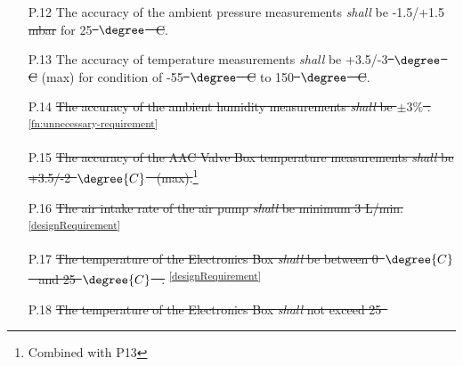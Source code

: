 \documentclass[a4paper,12pt,oneside]{article} %
\providecommand{\DIFaddtex}[1]{{\protect\color{blue}\uwave{#1}}} %
\providecommand{\DIFdeltex}[1]{{\protect\color{red}\sout{#1}}}                      %
\providecommand{\DIFaddbegin}{} %
\providecommand{\DIFaddend}{} %
\providecommand{\DIFdelbegin}{} %
\providecommand{\DIFdelend}{} %
\providecommand{\DIFadd}[1]{\texorpdfstring{\DIFaddtex{#1}}{#1}} %
\providecommand{\DIFdel}[1]{\texorpdfstring{\DIFdeltex{#1}}{}} %
\newcommand{\DIFscaledelfig}{0.5}
\newlength{\DIFdelgraphicswidth} %
\newlength{\DIFdelgraphicsheight} %
\newcommand{\DIFaddincludegraphics}[2][]{{\color{blue}\fbox{\DIFOincludegraphics[#1]{#2}}}} %
\newcommand{\DIFdelincludegraphics}[2][]{%
\sbox{\DIFdelgraphicsbox}{\DIFOincludegraphics[#1]{#2}}%
\settoboxwidth{\DIFdelgraphicswidth}{\DIFdelgraphicsbox} %
\settoboxtotalheight{\DIFdelgraphicsheight}{\DIFdelgraphicsbox} %
\scalebox{\DIFscaledelfig}{%
\parbox[b]{\DIFdelgraphicswidth}{\usebox{\DIFdelgraphicsbox}\\[-\baselineskip] \rule{\DIFdelgraphicswidth}{0em}}\llap{\resizebox{\DIFdelgraphicswidth}{\DIFdelgraphicsheight}{%
\setlength{\unitlength}{\DIFdelgraphicswidth}%
\begin{picture}(1,1)%
\thicklines\linethickness{2pt} %
{\color[rgb]{1,0,0}\put(0,0){\framebox(1,1){}}}%
{\color[rgb]{1,0,0}\put(0,0){\line( 1,1){1}}}%
{\color[rgb]{1,0,0}\put(0,1){\line(1,-1){1}}}%
\end{picture}%
}\hspace*{3pt}}} %
} %
\DeclareRobustCommand{\DIFaddbegin}{\DIFOaddbegin \let\includegraphics\DIFaddincludegraphics} %
\DeclareRobustCommand{\DIFaddend}{\DIFOaddend \let\includegraphics\DIFOincludegraphics} %
\DeclareRobustCommand{\DIFdelbegin}{\DIFOdelbegin \let\includegraphics\DIFdelincludegraphics} %
\DeclareRobustCommand{\DIFdelend}{\DIFOaddend \let\includegraphics\DIFOincludegraphics} %
\begin{document}
\begin{appendices}
\begin{enumerate}
    \item[P.12] The accuracy of the ambient pressure measurements \textit{shall} be -1.5/+1.5 \DIFdelbegin \DIFdel{mbar }\DIFdelend \DIFaddbegin \DIFadd{hPa }\DIFaddend for 25\DIFdelbegin \DIFdel{\mbox{%
$\degree$
}%
C}\DIFdelend \DIFaddbegin \DIFadd{\mbox{%
$\degree{C}$
}%
}\DIFaddend .
    \item[P.13] The accuracy of temperature measurements \textit{shall} be +3.5/-3\DIFdelbegin \DIFdel{\mbox{%
$\degree$
}%
C }\DIFdelend \DIFaddbegin \DIFadd{\mbox{%
$\degree{C}$
}%
}\DIFaddend (max) for condition of -55\DIFdelbegin \DIFdel{\mbox{%
$\degree$
}%
C }\DIFdelend \DIFaddbegin \DIFadd{\mbox{%
$\degree{C}$
}%
}\DIFaddend to 150\DIFdelbegin \DIFdel{\mbox{%
$\degree$
}%
C}\DIFdelend \DIFaddbegin \DIFadd{\mbox{%
$\degree{C}$
}%
}\DIFaddend .
    \item[P.14] \st{The accuracy of the ambient humidity measurements \textit{shall} be $\pm 3\%$ .} \cite{Humiditysensor}\textsuperscript{\ref{fn:unnecessary-requirement}}
    \item[P.15] \DIFdelbegin %
\DIFdelend \DIFaddbegin \st{The accuracy of the AAC Valve Box temperature measurements \textit{shall} be +3.5/-2\mbox{%
$\degree{C}$
}%
(max).}\DIFaddend \footnote{Combined with P13\label{fn:combi-p13}}
    \item[P.16] \st{The air intake rate of the air pump \textit{shall} be minimum 3 L/min.}\textsuperscript{\ref{designRequirement}}
    \item[P.17] \DIFdelbegin %
\DIFdelend \DIFaddbegin \st{The temperature of the Electronics Box \textit{shall} be between 0\mbox{%
$\degree{C}$
}%
and 25\mbox{%
$\degree{C}$
}%
.} \DIFaddend \textsuperscript{\ref{designRequirement}}
    \item[P.18] \DIFdelbegin %
\DIFdelend \DIFaddbegin \st{The temperature of the Electronics Box \textit{shall} not exceed 25\mbox{%
}}
\end{enumerate}
\end{appendices}
\end{document}
